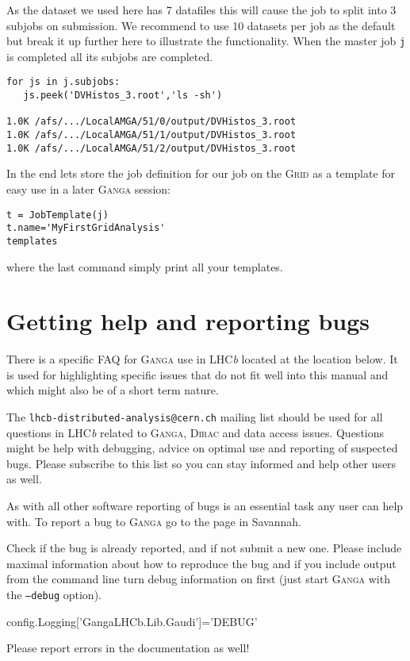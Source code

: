 \documentclass{howto}
\def\ganga {\textsc{Ganga}\xspace}
\def\lhcb {LHC{\em b\/}\xspace}
\def\dirac {\textsc{Dirac}\xspace}
\def\grid {\textsc{Grid}\xspace}
\begin{document}
As the dataset we used here has 7 datafiles this will cause the job to split
into 3 subjobs on submission. We recommend to use 10 datasets per job as the
default but break it up further here to illustrate the functionality. When the
master job \texttt{j} is completed all its subjobs are completed.
\begin{verbatim}
for js in j.subjobs:
   js.peek('DVHistos_3.root','ls -sh')

1.0K /afs/.../LocalAMGA/51/0/output/DVHistos_3.root
1.0K /afs/.../LocalAMGA/51/1/output/DVHistos_3.root
1.0K /afs/.../LocalAMGA/51/2/output/DVHistos_3.root
\end{verbatim}

In the end lets store the job definition for our job on the \grid as a template
for easy use in a later \ganga session:
\begin{verbatim}
t = JobTemplate(j)
t.name='MyFirstGridAnalysis'
templates
\end{verbatim}
where the last command simply print all your templates.

\section{Getting help and reporting bugs}
There is a specific FAQ for \ganga use in \lhcb located at the location
below. It is used for highlighting specific issues that do not fit well into
this manual and which might also be of a short term nature.
\begin{seealso}
\end{seealso}

The \texttt{lhcb-distributed-analysis@cern.ch} mailing list should be used for
all questions in \lhcb related to \ganga, \dirac and data access issues.
Questions might be help with debugging, advice on optimal use and reporting of
suspected bugs. Please subscribe to this list so you can stay informed and
help other users as well.

As with all other software reporting of bugs is an essential task any user can
help with. To report a bug to \ganga go to the page in Savannah.
\begin{seealso}
\end{seealso}
Check if the bug is already reported, and if not submit a new one. Please
include maximal information about how to reproduce the bug and if you include
output from the command line turn debug information on first (just start
\ganga with the \texttt{--debug} option).

config.Logging['GangaLHCb.Lib.Gaudi']='DEBUG'

Please report errors in the documentation as well!
\end{document}
